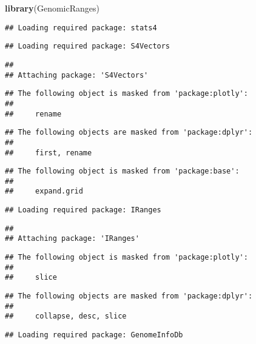 \documentclass[]{article}
\newenvironment{Shaded}{\begin{snugshade}}{\end{snugshade}}
\newcommand{\KeywordTok}[1]{\textcolor[rgb]{0.13,0.29,0.53}{\textbf{#1}}}
\newcommand{\NormalTok}[1]{#1}
\begin{document}
\begin{Shaded}
\begin{Highlighting}[]
\KeywordTok{library}\NormalTok{(GenomicRanges)}
\end{Highlighting}
\end{Shaded}

\begin{verbatim}
## Loading required package: stats4
\end{verbatim}

\begin{verbatim}
## Loading required package: S4Vectors
\end{verbatim}

\begin{verbatim}
## 
## Attaching package: 'S4Vectors'
\end{verbatim}

\begin{verbatim}
## The following object is masked from 'package:plotly':
## 
##     rename
\end{verbatim}

\begin{verbatim}
## The following objects are masked from 'package:dplyr':
## 
##     first, rename
\end{verbatim}

\begin{verbatim}
## The following object is masked from 'package:base':
## 
##     expand.grid
\end{verbatim}

\begin{verbatim}
## Loading required package: IRanges
\end{verbatim}

\begin{verbatim}
## 
## Attaching package: 'IRanges'
\end{verbatim}

\begin{verbatim}
## The following object is masked from 'package:plotly':
## 
##     slice
\end{verbatim}

\begin{verbatim}
## The following objects are masked from 'package:dplyr':
## 
##     collapse, desc, slice
\end{verbatim}

\begin{verbatim}
## Loading required package: GenomeInfoDb
\end{verbatim}
\end{document}
